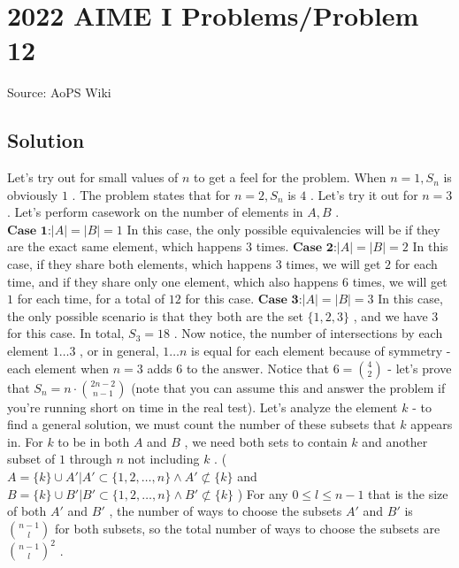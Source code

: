 \documentclass[12pt]{article}
\begin{document}
\section*{{2022 AIME I Problems/Problem 12}}
Source: AoPS Wiki

\subsection*{Solution}
Let's try out for small values of $n$ to get a feel for the problem. When $n=1, S_n$ is obviously $1$ . The problem states that for $n=2, S_n$ is $4$ . Let's try it out for $n=3$ . Let's perform casework on the number of elements in $A, B$ . $\textbf{Case 1:} |A| = |B| = 1$ In this case, the only possible equivalencies will be if they are the exact same element, which happens $3$ times. $\textbf{Case 2:} |A| = |B| = 2$ In this case, if they share both elements, which happens $3$ times, we will get $2$ for each time, and if they share only one element, which also happens $6$ times, we will get $1$ for each time, for a total of $12$ for this case. $\textbf{Case 3:} |A| = |B| = 3$ In this case, the only possible scenario is that they both are the set $\{1,2,3\}$ , and we have $3$ for this case. In total, $S_3 = 18$ . Now notice, the number of intersections by each element $1 \ldots 3$ , or in general, $1 \ldots n$ is equal for each element because of symmetry - each element when $n=3$ adds $6$ to the answer. Notice that $6 = \binom{4}{2}$ - let's prove that $S_n = n \cdot \binom{2n-2}{n-1}$ (note that you can assume this and answer the problem if you're running short on time in the real test). Let's analyze the element $k$ - to find a general solution, we must count the number of these subsets that $k$ appears in. For $k$ to be in both $A$ and $B$ , we need both sets to contain $k$ and another subset of $1$ through $n$ not including $k$ . ( $A = \{k\} \cup A'| A' \subset \{1,2,\ldots,n\} \land A' \not \subset \{k\}$ and $B = \{k\} \cup B'| B' \subset \{1,2,\ldots,n\} \land B' \not \subset \{k\}$ ) For any $0\leq l \leq n-1$ that is the size of both $A'$ and $B'$ , the number of ways to choose the subsets $A'$ and $B'$ is $\binom{n-1}{l}$ for both subsets, so the total number of ways to choose the subsets are $\binom{n-1}{l}^2$ .
\end{document}
